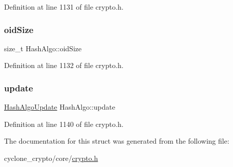 Definition at line 1131 of file crypto.\+h.

\mbox{\label{structHashAlgo_a3c31200f0d9ee2ee3ad36b7e405814d2}} 
\subsubsection{\texorpdfstring{oid\+Size}{oidSize}}
{\footnotesize\ttfamily size\+\_\+t Hash\+Algo\+::oid\+Size}



Definition at line 1132 of file crypto.\+h.

\mbox{\label{structHashAlgo_a83df6297595f1b9de65143df15fafda4}} 
\subsubsection{\texorpdfstring{update}{update}}
{\footnotesize\ttfamily \hyperlink{cyclone__crypto_2core_2crypto_8h_a3d1fb45d6ca7822d20873ddbc8e39b89}{Hash\+Algo\+Update} Hash\+Algo\+::update}



Definition at line 1140 of file crypto.\+h.



The documentation for this struct was generated from the following file\+:\begin{DoxyCompactItemize}
\item 
cyclone\+\_\+crypto/core/\hyperlink{cyclone__crypto_2core_2crypto_8h}{crypto.\+h}\end{DoxyCompactItemize}
